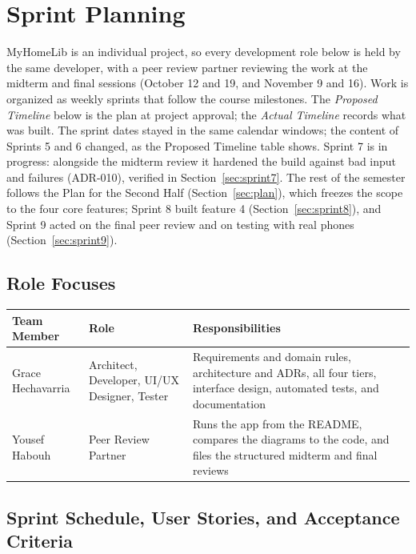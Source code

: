 \documentclass[12pt]{article}
\begin{document}
\section{Sprint Planning}

MyHomeLib is an individual project, so every development role below is held by the same developer, with a peer review partner reviewing the work at the midterm and final sessions (October 12 and 19, and November 9 and 16). Work is organized as weekly sprints that follow the course milestones. The \emph{Proposed Timeline} below is the plan at project approval; the \emph{Actual Timeline} records what was built. The sprint dates stayed in the same calendar windows; the content of Sprints 5 and 6 changed, as the Proposed Timeline table shows. Sprint 7 is in progress: alongside the midterm review it hardened the build against bad input and failures (ADR-010), verified in Section~\ref{sec:sprint7}. The rest of the semester follows the Plan for the Second Half (Section~\ref{sec:plan}), which freezes the scope to the four core features; Sprint 8 built feature 4 (Section~\ref{sec:sprint8}), and Sprint 9 acted on the final peer review and on testing with real phones (Section~\ref{sec:sprint9}).


\subsection{Role Focuses}

\vspace{0.3em}

\noindent
\begin{longtable}{|L{3.4cm}|L{4.2cm}|L{7.4cm}|}
\hline
\textbf{Team Member} & \textbf{Role} & \textbf{Responsibilities} \\
\hline
\endhead
Grace Hechavarria & Architect, Developer, UI/UX Designer, Tester & Requirements and domain rules, architecture and ADRs, all four tiers, interface design, automated tests, and documentation \\
\hline
Yousef Habouh & Peer Review Partner & Runs the app from the README, compares the diagrams to the code, and files the structured midterm and final reviews \\
\hline
\end{longtable}

\subsection{Sprint Schedule, User Stories, and Acceptance Criteria}
\end{document}
